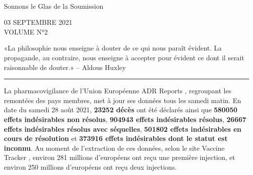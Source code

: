 \documentclass[a4paper]{article}
\date{Le vendredi 03 septembre 2021}
\begin{document}
\begin{multicols}{3}

  \begin{center}
    \vspace*{1cm}
            {}\hfill \\
            \vspace{0.1cm}
            \footnotesize{Sonnons le Glas de la Soumission}
  \end{center}
  
  \vspace*{0.1in}
  \begin{center}
    \MakeUppercase{\small 03 septembre 2021 \\ Volume n°2}\hfill \\
    \vspace*{0.2in}

    \begin{minipage}{5cm}
      \begin{center}
        \noindent «La philosophie nous enseigne à douter de ce qui nous
        paraît évident. La propagande, au contraire, nous enseigne à
        accepter pour évident ce dont il serait raisonnable de douter.»
        -- Aldous Huxley
      \end{center}
    \vspace*{1cm}
    \end{minipage}
    
    \vspace*{-16pt}
    \rule[1pt]{\hsize}{1pt}
  \end{center}


  La pharmacovigilance de l'Union Européenne ADR Reports
  \cite{AdrReports}, regroupant les remontées des pays membres, met à
  jour ses données tous les samedi matin. En date du samedi 28 août
  2021, \textbf{23252 décès} ont été déclarés ainsi que \textbf{580050
    effets indésirables non résolus}, \textbf{904943 effets
    indésirables résolus}, \textbf{26667 effets indésirables résolus
    avec séquelles}, \textbf{501802 effets indésirables en cours de
    résolution} et \textbf{373916 effets indésirables dont le statut
    est inconnu}. Au moment de l'extraction de ces données, selon le
  site Vaccine Tracker \cite{VaccineTracker}, environ 281 millions
  d'européens ont reçu une première injection, et environ 250 millions
  d'européens ont reçu deux injections.


\end{multicols}
\end{document}
